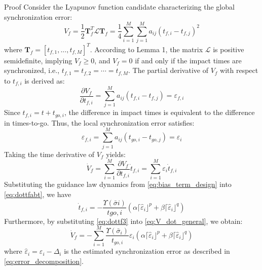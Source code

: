 \documentclass[lettersize,journal]{IEEEtran}
\begin{document}
Proof Consider the Lyapunov function candidate characterizing the global synchronization error:
\begin{equation}
	\label{eq:Lyapunov_guidance}
	V_f = \frac{1}{2} \boldsymbol{T}_{f}^T \mathcal{L} \boldsymbol{T}_{f} = \frac{1}{4} \sum_{i=1}^{M} \sum_{j=1}^{M} a_{ij} (t_{f,i} - t_{f,j})^2
\end{equation}
where $\boldsymbol{T}_{f}=[t_{f,1},...,t_{f,M}]^T$. According to Lemma 1, the matrix $\mathcal{L}$ is positive semidefinite, implying $V_f \ge 0$, and $V_f=0$ if and only if the impact times are synchronized, i.e., $t_{f,1}=t_{f,2} =\cdots=t_{f,M}$. The partial derivative of $V_f$ with respect to $t_{f,i}$ is derived as:
\begin{equation}
	\frac{\partial V_f}{\partial t_{f,i}} = \sum_{j=1}^{M} a_{ij}(t_{f,i} - t_{f,j}) = \varepsilon_{f,i}
\end{equation}
Since $t_{f,i} = t + t_{go,i}$, the difference in impact times is equivalent to the difference in times-to-go. Thus, the local synchronization error satisfies:
\begin{equation}
	\varepsilon_{f,i}=\sum_{j=1}^{M} a_{ij} (t_{go,i} - t_{go,j})=\varepsilon_{i}
\end{equation}
Taking the time derivative of $V_f$ yields:
\begin{equation}
	\label{eq:V_dot_general}
	\dot{V}_f = \sum_{i=1}^{M} \frac{\partial V_f}{\partial t_{f,i}} \dot{t}_{f,i} = \sum_{i=1}^{M} \varepsilon_{i} \dot{t}_{f,i}
\end{equation}
Substituting the guidance law dynamics from \eqref{eq:bias_term_design} into \eqref{eq:dottfabt}, we have
\begin{equation}
	\label{eq:dottf3}
	\dot{t}_{f,i} = - \frac{\Upsilon(\bar{\sigma}i)}{t{go,i}} \left( \alpha \lceil \hat{\varepsilon}_i \rfloor^p + \beta \lceil \hat{\varepsilon}_i \rfloor^q \right)
\end{equation}
Furthermore, by substituting \eqref{eq:dottf3} into \eqref{eq:V_dot_general}, we obtain:
\begin{equation}
	\label{eq:V_dot_substituted}
	\dot{V}_f = - \sum_{i=1}^{M} \frac{\Upsilon(\bar{\sigma}_i)}{t_{go,i}} \varepsilon_{i} \left( \alpha \lceil \hat{\varepsilon}_i \rfloor^p + \beta \lceil \hat{\varepsilon}_i \rfloor^q \right)
\end{equation}
where $\hat{\varepsilon}_i = \varepsilon_i - \Delta_i$ is the estimated synchronization error as described in \eqref{eq:error_decomposition}.
\end{document}
